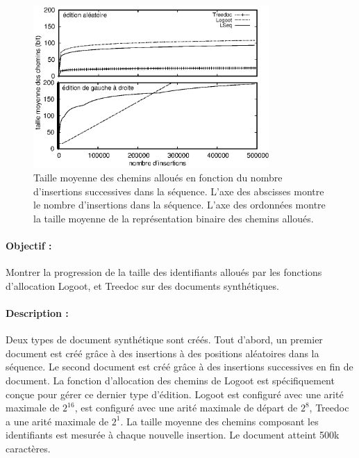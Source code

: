 \begin{figure}
  \begin{center}
    \includegraphics[width=0.8\textwidth]{img/lseq/space.eps}
    \caption[Taille moyenne des chemins sur des documents synthétiques]
    {\label{repl:img:motivationartificial}Taille moyenne des chemins alloués en
      fonction du nombre d'insertions successives dans la séquence. L'axe des
      abscisses montre le nombre d'insertions dans la séquence. L'axe des
      ordonnées montre la taille moyenne de la représentation binaire des
      chemins alloués.}
  \end{center}
\end{figure}

\paragraph{Objectif :} Montrer la progression de la taille des identifiants
alloués par les fonctions d'allocation Logoot, \LSEQ et Treedoc sur des
documents synthétiques.

\paragraph{Description :} Deux types de document synthétique sont créés. Tout
d'abord, un premier document est créé grâce à des insertions à des positions
aléatoires dans la séquence. Le second document est créé grâce à des insertions
successives en fin de document. La fonction d'allocation des chemins de Logoot
est spécifiquement conçue pour gérer ce dernier type d'édition. Logoot est
configuré avec une arité maximale de $2^{16}$, \LSEQ est configuré avec une
arité maximale de départ de $2^8$, Treedoc a une arité maximale de $2^1$.  La
taille moyenne des chemins composant les identifiants est mesurée à chaque
nouvelle insertion. Le document atteint 500k caractères.

